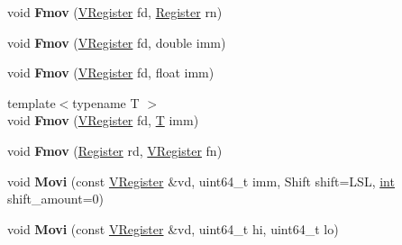 \begin{DoxyCompactItemize}
void {\bfseries Fmov} (\mbox{\hyperlink{classv8_1_1internal_1_1VRegister}{V\+Register}} fd, \mbox{\hyperlink{classv8_1_1internal_1_1Register}{Register}} rn)
\item 
\mbox{\label{classv8_1_1internal_1_1TurboAssembler_aab778b040cfac2f7e39da1651eae240b}} 
void {\bfseries Fmov} (\mbox{\hyperlink{classv8_1_1internal_1_1VRegister}{V\+Register}} fd, double imm)
\item 
\mbox{\label{classv8_1_1internal_1_1TurboAssembler_a34d2ed5efc93b0ed1a19ccc77ec070c9}} 
void {\bfseries Fmov} (\mbox{\hyperlink{classv8_1_1internal_1_1VRegister}{V\+Register}} fd, float imm)
\item 
\mbox{\label{classv8_1_1internal_1_1TurboAssembler_aba292d1a4899a654dcb67299a52120e1}} 
{\footnotesize template$<$typename T $>$ }\\void {\bfseries Fmov} (\mbox{\hyperlink{classv8_1_1internal_1_1VRegister}{V\+Register}} fd, \mbox{\hyperlink{classv8_1_1internal_1_1torque_1_1T}{T}} imm)
\item 
\mbox{\label{classv8_1_1internal_1_1TurboAssembler_a77fe11413da7423f60369d0efe009e01}} 
void {\bfseries Fmov} (\mbox{\hyperlink{classv8_1_1internal_1_1Register}{Register}} rd, \mbox{\hyperlink{classv8_1_1internal_1_1VRegister}{V\+Register}} fn)
\item 
\mbox{\label{classv8_1_1internal_1_1TurboAssembler_ad8a24cd8a2907c0e3a3ebb4d913835fb}} 
void {\bfseries Movi} (const \mbox{\hyperlink{classv8_1_1internal_1_1VRegister}{V\+Register}} \&vd, uint64\+\_\+t imm, Shift shift=L\+SL, \mbox{\hyperlink{classint}{int}} shift\+\_\+amount=0)
\item 
\mbox{\label{classv8_1_1internal_1_1TurboAssembler_a98c15bf7dfd3f2f1a1c9a731831ee460}} 
void {\bfseries Movi} (const \mbox{\hyperlink{classv8_1_1internal_1_1VRegister}{V\+Register}} \&vd, uint64\+\_\+t hi, uint64\+\_\+t lo)
\item 
\mbox{\label{classv8_1_1internal_1_1TurboAssembler_a6c8fae865ac1fd7f79f9d4934a46392a}} 

\end{DoxyCompactItemize}
